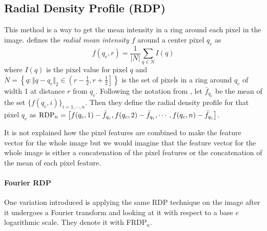 \begin{multicols}{2}
\subsection{Radial Density Profile (RDP)}
This method is a way to get the mean intensity in a ring around each pixel in the image. \citet{kylberg2011virus} defines the \emph{radial mean intensity $f$} around a center pixel $q_c$ as 
\[ f(q_c, r) = \frac{1}{|N|} \sum\limits_{q\in N} I(q) \]
where $I(q)$ is the pixel value for pixel $q$ and $N = \left\{ q: \Vert q-q_c \Vert_2 \in \left( r-\frac{1}{2}, r+\frac{1}{2} \right] \right\}$ is the set of pixels in a ring around $q_c$ of width 1 at distance $r$ from $q_c$. Following the notation from \citet{kylberg2011virus}, let $\bar{f}_{q_c}$ be the mean of the set $\{ f(q_c,i) \}_{i = 1, \cdots, n}$. Then they define the radial density profile for that pixel $q_c$ as $\textnormal{RDP}_n = \left[ f(q_c,1)-\bar{f}_{q_c}, f(q_c, 2)-\bar{f}_{q_c}, \cdots, f(q_c,n)-\bar{f}_{q_c} \right]$. 
\par It is not explained how the pixel features are combined to make the feature vector for the whole image but we would imagine that the feature vector for the whole image is either a concatenation of the pixel features or the concatenation of the mean of each pixel feature. 
\paragraph{Fourier RDP} One variation \citet{kylberg2011virus} introduced is applying the same RDP technique on the image after it undergoes a Fourier transform and looking at it with respect to a base $e$ logarithmic scale. They denote it with FRDP$_n$. 

\newpage


\end{multicols}

